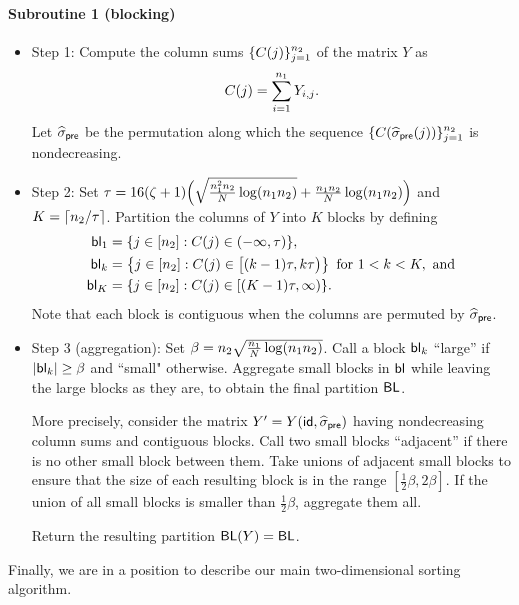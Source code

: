 \documentclass[final,12pt]{colt2018} %
\begin{document}
\paragraph{Subroutine 1 (blocking)}
\begin{itemize}
\item Step 1: Compute the column sums $\{C(j)\}_{j = 1}^{n_2}$ of
  the matrix $Y$ as
\begin{align*}
C(j) = \sum_{i=1}^{n_1} Y_{i,j}.
\end{align*} 
Let $\widehat{\sigma}_{\sf pre}$ be the permutation along which the sequence
$\{C(\widehat{\sigma}_{\sf pre}(j))\}_{j=1}^{n_2}$ is nondecreasing.

\item Step 2: Set $\tau = 16 (\zeta + 1) \Big( \sqrt{\frac{n_1^2
    n_2}{N} \log(n_1 n_2) } + \frac{n_1 n_2}{N}
  \log(n_1 n_2) \Big)$ and $K = \lceil n_2/\tau
  \rceil$. Partition the columns of $Y$ into $K$ blocks by defining
\begin{align*}
\mathsf{bl}_1 &= \{j \in [n_2]: C(j) \in (-\infty, \tau) \}, \\ \mathsf{bl}_k &=
\left\{j \in [n_2] : C(j) \in \big[ (k - 1) \tau , k \tau \big)
  \right\} \text{ for } 1<k<K, \text{ and} \\ \mathsf{bl}_K &= \{j \in
           [n_2]: C(j) \in [(K-1)\tau, \infty)\}.
\end{align*}
Note that each block is contiguous when the columns are permuted by
$\widehat{\sigma}_{\sf pre}$.

\item Step 3 (aggregation): Set $\beta = n_2 \sqrt{\frac{n_1}{N} \log (n_1 n_2) }$. Call a block
  $\mathsf{bl}_k$ ``large'' if $|\mathsf{bl}_k| \geq \beta$ and ``small"
  otherwise. Aggregate small blocks in $\mathsf{bl}$ while leaving the large
  blocks as they are, to obtain the final partition $\mathsf{BL}$.

More precisely, consider the matrix $Y' = Y(\mathsf{id}, \widehat{\sigma}_{\sf pre})$ having
nondecreasing column sums and contiguous blocks. Call two small blocks
``adjacent'' if there is no other small block between them.  Take
unions of adjacent small blocks to ensure that the size of each
resulting block is in the range $[ \frac{1}{2} \beta, 2 \beta]$. If
the union of all small blocks is smaller than $\frac{1}{2} \beta$,
aggregate them all.

Return the resulting partition $\mathsf{BL}(Y) = \mathsf{BL}$.
\end{itemize}

Finally, we are in a position to describe our main two-dimensional sorting algorithm.
\end{document}
